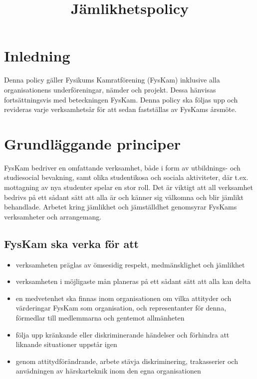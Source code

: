 \documentclass{../resources/dgovdoc}
\title{Jämlikhetspolicy}
\begin{document}
\maketitle

\section{Inledning}

Denna policy gäller Fysikums Kamratförening (FysKam) inklusive alla
organisationens underföreningar, nämder och projekt. Dessa hänvisas fortsättningsvis
med beteckningen FysKam. Denna policy ska följas upp och revideras
varje verksamhetsår för att sedan fastställas av FysKams årsmöte.

\section{Grundläggande principer}

FysKam bedriver en omfattande verksamhet, både i form av
utbildnings- och studiesocial bevakning, samt olika studentikosa och sociala aktiviteter,
där t.ex. mottagning av nya studenter spelar en stor roll. Det är viktigt att all
verksamhet bedrivs på ett sådant sätt att alla är och känner sig välkomna och blir
jämlikt behandlade. Arbetet kring jämlikhet och jämställdhet genomsyrar FysKams
verksamheter och arrangemang.

\subsection{FysKam ska verka för att}

\begin{itemize}
\item verksamheten präglas av ömsesidig respekt, medmänsklighet och jämlikhet
\item verksamheten i möjligaste mån planeras på ett sådant sätt att alla kan delta
\item en medvetenhet ska finnas inom organisationen om vilka attityder och
värderingar FysKam som organisation, och representanter för denna, förmedlar till
medlemmarna och gentemot allmänheten
\item följa upp kränkande eller diskriminerande händelser och förhindra att liknande
situationer uppstår igen
\item genom attitydförändrande, arbete stävja diskriminering, trakasserier och
anvädningen av härskarteknik inom den egna organisationen
\end{itemize}
\end{document}
